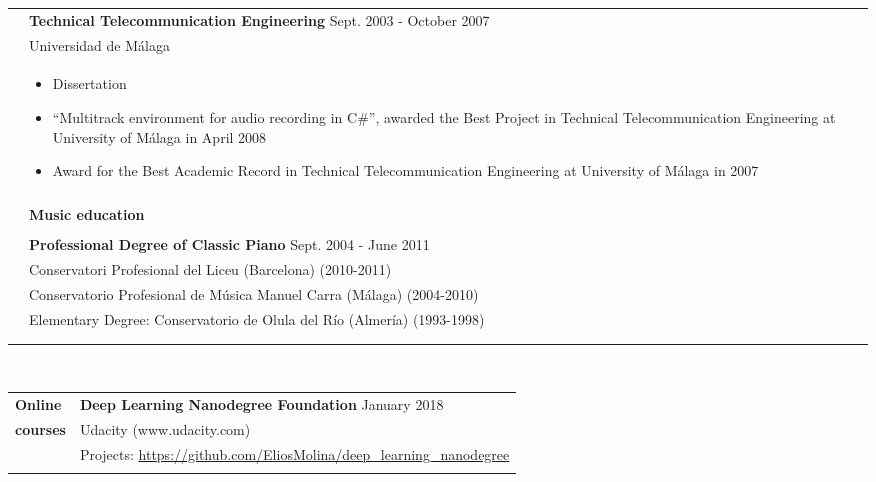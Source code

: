 \documentclass[letterpaper,11pt,oneside]{article}
\begin{document}
\noindent \begin{tabularx}{\linewidth}{l X}
     \hspace{2.5cm} & \textbf{Technical Telecommunication Engineering} \hfill Sept. 2003 - October 2007\\
     & Universidad de Málaga\\
     & \vspace{-0.1cm}\begin{itemize}[nosep,noitemsep,topsep=0pt,partopsep=0pt]
         \item Dissertation
         \item[] ``Multitrack environment for audio recording in C\#'', awarded the Best Project in Technical Telecommunication Engineering at University of Málaga in April 2008
         \item Award for the Best Academic Record in Technical Telecommunication Engineering at University of Málaga in 2007
     \end{itemize}\\
     \\
     & \textbf{\normalsize{Music education}}\\
     \\
     \hspace{2.5cm} & \textbf{Professional Degree of Classic Piano} \hfill Sept. 2004 - June 2011\\
     & Conservatori Profesional del Liceu (Barcelona) (2010-2011)\\
     & Conservatorio Profesional de Música Manuel Carra (Málaga) (2004-2010)\\
     & Elementary Degree: Conservatorio de Olula del Río (Almería) (1993-1998)\\
     &\\
     \\
\end{tabularx}
\\
\noindent \begin{tabularx}{\linewidth}{l X}
 \Large{\textbf{Online\hspace{0.9cm}}}    & \textbf{Deep Learning Nanodegree Foundation} \hfill January 2018\\
\Large{\textbf{courses}} & Udacity (www.udacity.com)\\
     & Projects: \url{https://github.com/EliosMolina/deep_learning_nanodegree}
     &\\
     \\
\end{tabularx}
\\
\end{document}
